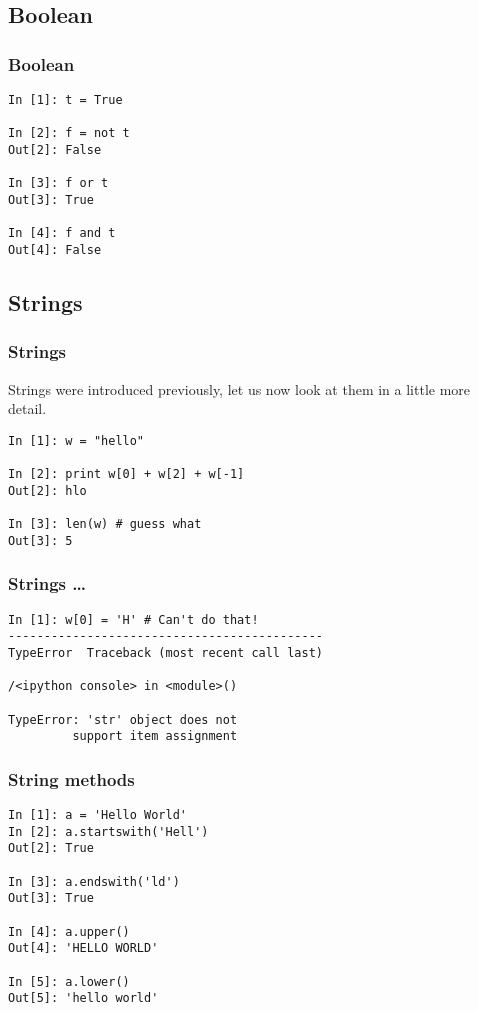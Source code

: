 \documentclass[14pt,compress]{beamer}
\newcounter{time}
\newcommand{\inctime}[1]{\addtocounter{time}{#1}{\tiny \thetime\ m}}
\begin{document}
\subsection{Boolean}
\begin{frame}[fragile]
  \frametitle{Boolean}
  \begin{lstlisting}
In [1]: t = True

In [2]: f = not t
Out[2]: False

In [3]: f or t
Out[3]: True

In [4]: f and t
Out[4]: False
  \end{lstlisting}
  \inctime{5}
\end{frame}

\subsection{Strings}

\begin{frame}[fragile]
  \frametitle{Strings}
Strings were introduced previously, let us now look at them in a little more detail.
  \begin{lstlisting}
In [1]: w = "hello"

In [2]: print w[0] + w[2] + w[-1]
Out[2]: hlo

In [3]: len(w) # guess what
Out[3]: 5
  \end{lstlisting}
\end{frame}

\begin{frame}[fragile]
  \frametitle{Strings \ldots}
  \begin{lstlisting}
In [1]: w[0] = 'H' # Can't do that!
--------------------------------------------
TypeError  Traceback (most recent call last)

/<ipython console> in <module>()

TypeError: 'str' object does not
         support item assignment
  \end{lstlisting}
\end{frame}

\begin{frame}[fragile]
  \frametitle{String methods}
  \begin{lstlisting}
In [1]: a = 'Hello World'
In [2]: a.startswith('Hell')
Out[2]: True

In [3]: a.endswith('ld')
Out[3]: True

In [4]: a.upper()
Out[4]: 'HELLO WORLD'

In [5]: a.lower()
Out[5]: 'hello world'
  \end{lstlisting}
\end{frame}
\end{document}
